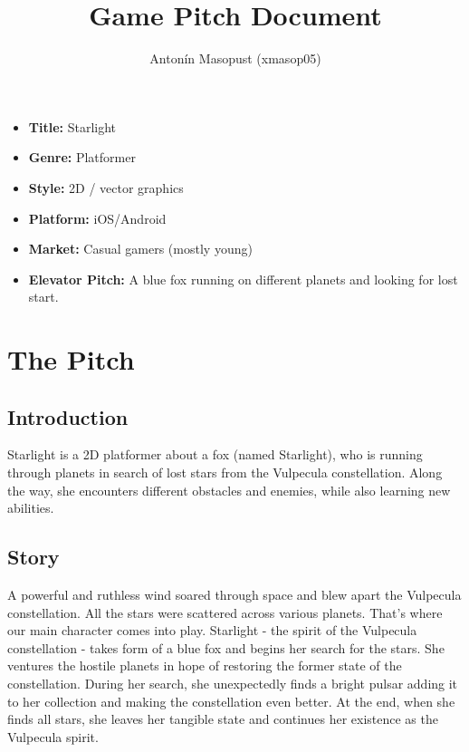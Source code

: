 \documentclass[a4paper,10pt,english]{article}
\title{%
Game Pitch Document%
}
\author{%
Antonín Masopust (xmasop05)%
}
\date{}
\begin{document}
\maketitle
\thispagestyle{empty}

{%
\large

\begin{itemize}

\item[] \textbf{Title:} Starlight

\item[] \textbf{Genre:} Platformer

\item[] \textbf{Style:} 2D / vector graphics

\item[] \textbf{Platform:} iOS/Android

\item[] \textbf{Market:} Casual gamers (mostly young)

\item[] \textbf{Elevator Pitch:} A blue fox running on different planets and looking for lost start.

\end{itemize}

}

\section*{\centering The Pitch}

\subsection*{Introduction}
Starlight is a 2D platformer about a fox (named Starlight), who is running through planets in search of lost stars from the Vulpecula constellation. Along the way, she encounters different obstacles and enemies, while also learning new abilities.

\subsection*{Story}
A powerful and ruthless wind soared through space and blew apart the Vulpecula constellation. All the stars were scattered across various planets. That's where our main character comes into play. Starlight - the spirit of the Vulpecula constellation - takes form of a blue fox and begins her search for the stars. She ventures the hostile planets in hope of restoring the former state of the constellation. During her search, she unexpectedly finds a bright pulsar adding it to her collection and making the constellation even better. At the end, when she finds all stars, she leaves her tangible state and continues her existence as the Vulpecula spirit.
\end{document}
